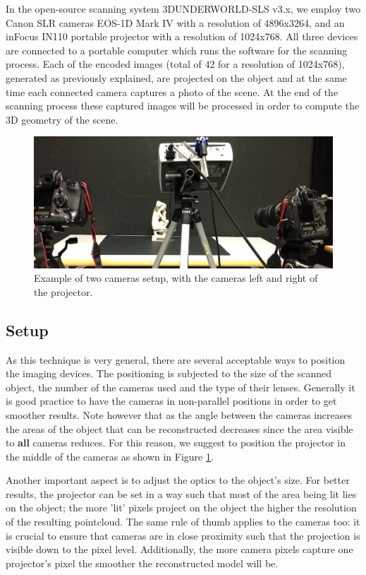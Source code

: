 \documentclass[final,12pt,3p]{elsarticle}
\begin{document}
In the open-source scanning system 3DUNDERWORLD-SLS v3.x, we employ two Canon SLR cameras EOS-1D Mark IV with a resolution of 4896x3264, and an inFocus IN110 portable projector with a resolution of 1024x768. All three devices are connected to a portable computer which runs the software for the scanning process. Each of the encoded images (total of 42 for a resolution of 1024x768), generated as previously explained, are projected on the object and at the same time each connected camera captures a photo of the scene. At the end of the scanning process these captured images will be processed in order to compute the 3D geometry of the scene.

\begin{figure}[!ht]
	\centering	
	\includegraphics[scale=0.24]{./images/setup.jpg}
	\caption{\label{fig:setup} Example of two cameras setup, with the cameras left and right of the projector.}
\end{figure}

\vspace{-20pt}
\subsection{Setup}
\label{subsec:setup}
As this technique is very general, there are several acceptable ways to position the imaging devices. The positioning is subjected to the size of the scanned object, the number of the cameras used and the type of their lenses. Generally it is good practice to have the cameras in non-parallel positions in order to get smoother results. Note however that as the angle between the cameras increases the areas of the object that can be reconstructed decreases since the area visible to \textbf{all} cameras reduces. For this reason, we suggest to position the projector in the middle of the cameras as shown in Figure \ref{fig:setup}.

Another important aspect is to adjust the optics to the object's size. For better results, the projector can be set in a way such that most of the area being lit lies on the object; the more 'lit' pixels project on the object the higher the resolution of the resulting pointcloud. The same rule of thumb applies to the cameras too: it is crucial to ensure that cameras are in close proximity such that the projection is visible down to the pixel level. Additionally, the more camera pixels capture one projector's pixel the smoother the reconstructed model will be. 
\end{document}
